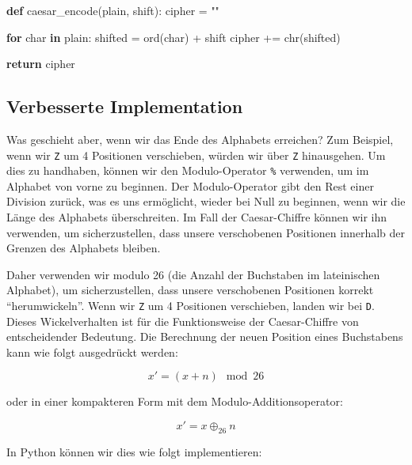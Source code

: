 \documentclass[
  nswissgerman,
  a4paper,
  DIV=11,
  numbers=noendperiod,
  ngerman]{scrreprt}
\newenvironment{Shaded}{\begin{snugshade}}{\end{snugshade}}
\newcommand{\BuiltInTok}[1]{\textcolor[rgb]{0.00,0.23,0.31}{#1}}
\newcommand{\ControlFlowTok}[1]{\textcolor[rgb]{0.00,0.23,0.31}{\textbf{#1}}}
\newcommand{\KeywordTok}[1]{\textcolor[rgb]{0.00,0.23,0.31}{\textbf{#1}}}
\newcommand{\NormalTok}[1]{\textcolor[rgb]{0.00,0.23,0.31}{#1}}
\newcommand{\OperatorTok}[1]{\textcolor[rgb]{0.37,0.37,0.37}{#1}}
\newcommand{\StringTok}[1]{\textcolor[rgb]{0.13,0.47,0.30}{#1}}
\begin{document}
\begin{Shaded}
\begin{Highlighting}[numbers=left,,]
\KeywordTok{def}\NormalTok{ caesar\_encode(plain, shift):}
\NormalTok{    cipher }\OperatorTok{=} \StringTok{""}
    
    \ControlFlowTok{for}\NormalTok{ char }\KeywordTok{in}\NormalTok{ plain:}
\NormalTok{        shifted }\OperatorTok{=} \BuiltInTok{ord}\NormalTok{(char) }\OperatorTok{+}\NormalTok{ shift}
\NormalTok{        cipher }\OperatorTok{+=} \BuiltInTok{chr}\NormalTok{(shifted)}
        
    \ControlFlowTok{return}\NormalTok{ cipher}
\end{Highlighting}
\end{Shaded}

\subsection{Verbesserte
Implementation}\label{verbesserte-implementation}

Was geschieht aber, wenn wir das Ende des Alphabets erreichen? Zum
Beispiel, wenn wir \texttt{Z} um 4 Positionen verschieben, würden wir
über \texttt{Z} hinausgehen. Um dies zu handhaben, können wir den
Modulo-Operator \texttt{\%} verwenden, um im Alphabet von vorne zu
beginnen. Der Modulo-Operator gibt den Rest einer Division zurück, was
es uns ermöglicht, wieder bei Null zu beginnen, wenn wir die Länge des
Alphabets überschreiten. Im Fall der Caesar-Chiffre können wir ihn
verwenden, um sicherzustellen, dass unsere verschobenen Positionen
innerhalb der Grenzen des Alphabets bleiben.

Daher verwenden wir modulo 26 (die Anzahl der Buchstaben im lateinischen
Alphabet), um sicherzustellen, dass unsere verschobenen Positionen
korrekt ``herumwickeln''. Wenn wir \texttt{Z} um 4 Positionen
verschieben, landen wir bei \texttt{D}. Dieses Wickelverhalten ist für
die Funktionsweise der Caesar-Chiffre von entscheidender Bedeutung. Die
Berechnung der neuen Position eines Buchstabens kann wie folgt
ausgedrückt werden:

\[
x' = (x + n) \mod 26
\]

oder in einer kompakteren Form mit dem Modulo-Additionsoperator:

\[
x' = x \oplus_{26} n
\]

In Python können wir dies wie folgt implementieren:
\end{document}
